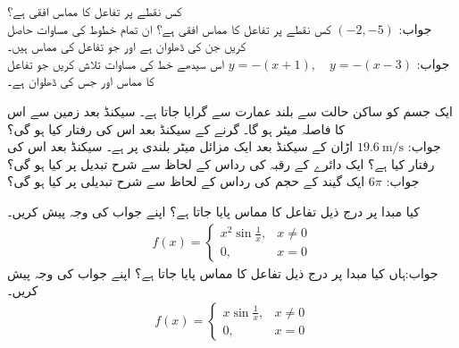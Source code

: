 کس نقطے پر تفاعل  کا مماس افقی ہے؟\\
جواب:\quad
$(-2,-5)$
کس نقطے پر تفاعل  کا مماس افقی ہے؟
ان تمام خطوط کی مساوات حاصل کریں جن کی ڈھلوان  ہے اور جو تفاعل  کی مماس ہیں۔\\
جواب:\quad
$y=-(x+1),\quad y=-(x-3)$
اس سیدھے خط کی مساوات تلاش کریں جو تفاعل  کا مماس اور جس کی ڈھلوان  ہے۔


ایک جسم کو ساکن حالت سے  بلند عمارت سے گرایا جاتا ہے۔ سیکنڈ بعد زمین سے اس کا فاصلہ  میٹر  ہو گا۔ گرنے کے  سیکنڈ بعد اس کی رفتار کیا ہو گی؟\\
جواب:\quad
$\SI{19.6}{\meter\per\second}$
اڑان کے  سیکنڈ بعد ایک مزائل  میٹر  بلندی پر ہے۔ سیکنڈ بعد اس کی رفتار کیا ہے؟
ایک دائرے کے رقبہ  کی رداس  کے لحاظ سے شرح تبدیل   پر کیا ہو گی؟ \\
جواب:\quad
$6\pi$
ایک گیند کے حجم  کی رداس  کے لحاظ سے شرح تبدیلی  پر کیا ہو گی؟


کیا مبدا پر درج ذیل تفاعل کا مماس پایا جاتا ہے؟ اپنے جواب کی وجہ پیش کریں۔
\begin{align*}
f(x)=\begin{cases}x^2\sin \tfrac{1}{x},& x\ne 0\\ 0,&x=0  \end{cases}
\end{align*}
جواب:\quad ہاں
کیا مبدا پر درج ذیل تفاعل کا مماس پایا جاتا ہے؟ اپنے جواب کی وجہ پیش کریں۔
\begin{align*}
f(x)=\begin{cases}x\sin \tfrac{1}{x},& x\ne 0\\ 0,&x=0  \end{cases}
\end{align*}

